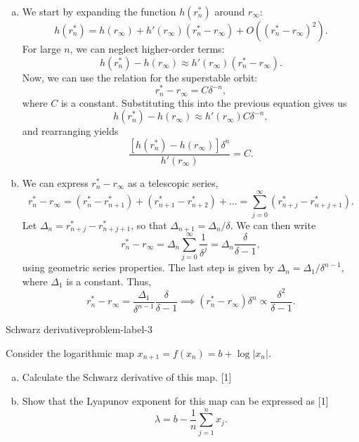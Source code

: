 \begin{enumerate}[(a)]
    \item We start by expanding the function $h(r_n^*)$ around $r_{\infty}$:
    \[
        h(r_n^*) = h(r_{\infty}) + h'(r_{\infty})(r_n^*-r_{\infty}) + O((r_n^*-r_{\infty})^2).
    \]
    For large $n$, we can neglect higher-order terms:
    \[
        h(r_n^*) - h(r_{\infty}) \approx h'(r_{\infty})(r_n^*-r_{\infty}).
    \]
    Now, we can use the relation for the superstable orbit:
    \[
        r_n^* - r_{\infty} = C \delta^{-n},
    \]
    where $C$ is a constant. Substituting this into the previous equation gives us
    \[
        h(r_n^*) - h(r_{\infty}) \approx h'(r_{\infty})C\delta^{-n},
    \]
    and rearranging yields
    \[
    \boxed{
        \frac{[h(r_n^*)-h(r_{\infty})]\delta^n}{h'(r_{\infty})} = C
    }.
    \]
    \item We can express $r_n^* - r_{\infty}$ as a telescopic series,
    \[
        r_n^* - r_{\infty} = (r_{n}^* - r_{n+1}^*) + (r_{n+1}^* - r_{n +2}^*) + \ldots = \sum_{j=0}^{\infty} (r_{n+j}^* - r_{n+j+1}^*).
    \]
    Let $\Delta_n = r_{n+j}^* - r_{n+j+1}^*$, so that $\Delta_{n+1} = \Delta_n/\delta$. We can then write
    \[
        r_n^* - r_{\infty} = \Delta_n \sum_{j=0}^{\infty} \frac{1}{\delta^j} = \Delta_n \frac{\delta}{\delta - 1},
    \]
    using geometric series properties. The last step is given by $\Delta_n = \Delta_1/\delta^{n-1}$, where $\Delta_1$ is a constant. Thus,
    \[
        r_n^* - r_{\infty} = \frac{\Delta_1}{\delta^{n-1}} \frac{\delta}{\delta - 1} \implies \boxed{
            (r_n^*-r_{\infty})\delta^n \propto \frac{\delta^2}{\delta -1}
        }.
    \]

\end{enumerate}

\begin{problem}{Schwarz derivative}{problem-label-3}

Consider the logarithmic map $x_{n+1}=f(x_n)=b+\log|x_n|$.

\begin{enumerate}[(a)]
    \item Calculate the Schwarz derivative of this map. [1]
    \item Show that the Lyapunov exponent for this map can be expressed as [1]
    \[
        \lambda = b - \frac{1}{n}\sum_{j=1}^{n}x_j.
    \] 
\end{enumerate}
\end{problem}

